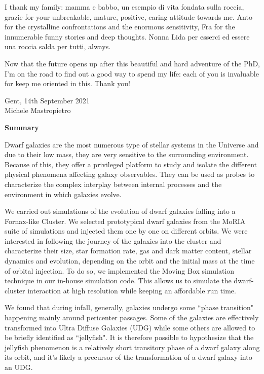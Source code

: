 {I thank my family: mamma e babbo, un esempio di vita fondata sulla roccia, grazie for your unbreakable, mature, positive, caring attitude towards me.
Anto for the crystalline confrontations and the enormous sensitivity, Fra for the innumerable funny stories and deep thoughts. Nonna Lida per esserci ed essere una roccia salda per tutti, always.

Now that the future opens up after this beautiful and hard adventure of the PhD, I'm on the road to find out a good way to spend my life: each of you is invaluable for keep me oriented in this. Thank you!

\begin{flushright}
  Gent, 14th September 2021\\Michele Mastropietro
\end{flushright}
}

\clearpage
\thispagestyle{empty}
\null%
\label{thesis:Summary}
\begin{center}
  {\Large \textbf{Summary}}\\
\end{center}

Dwarf galaxies are the most numerous type of stellar systems in the Universe and due to their low mass, they are very sensitive to the surrounding environment.
Because of this, they offer a privileged platform to study and isolate the different physical phenomena affecting galaxy observables.
They can be used as probes to characterize the complex interplay between internal processes and the environment in which galaxies evolve.

We carried out simulations of the evolution of dwarf galaxies falling into a Fornax-like Cluster.
We selected prototypical dwarf galaxies from the MoRIA suite of simulations and injected them one by one on different orbits.
We were interested in following the journey of the galaxies into the cluster and characterize their size, star formation rate, gas and dark matter content, stellar dynamics and evolution, depending on the orbit and the initial mass at the time of orbital injection.
To do so, we implemented the Moving Box simulation technique in our in-house simulation code.
This allows us to simulate the dwarf-cluster interaction at high resolution while keeping an affordable run time.

We found that during infall, generally, galaxies undergo some ``phase transition" happening mainly around pericenter passages.
Some of the galaxies are effectively transformed into Ultra Diffuse Galaxies (UDG) while some others are allowed to be briefly identified as ``jellyfish".
It is therefore possible to hypothesize that the jellyfish phenomenon is a relatively short transitory phase of a dwarf galaxy along its orbit, and it's likely a precursor of the transformation of a dwarf galaxy into an UDG.

